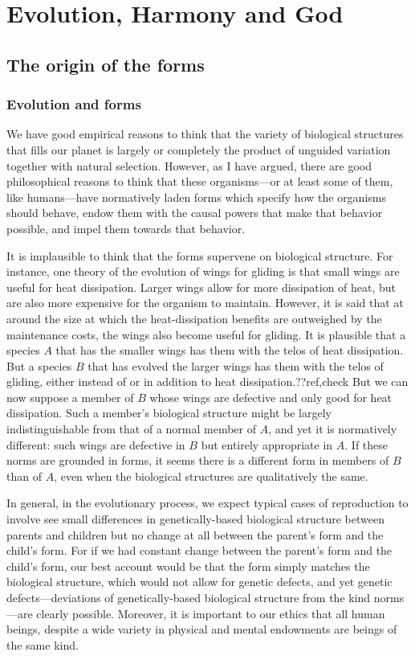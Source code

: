\def\mychapter{XI}

\chapter{Evolution, Harmony and God}\label{ch:God}
\section{The origin of the forms}
\subsection{Evolution and forms}
We have good empirical reasons to think that the variety of biological structures that fills our planet 
is largely or completely the product of unguided variation together with natural selection. However, as
I have argued, there are good philosophical reasons to think that these organisms---or at least some of
them, like humans---have normatively laden forms which specify how the organisms should behave, endow them with the causal
powers that make that behavior possible, and impel them towards that behavior. 

It is implausible to think that the forms supervene on biological structure. For instance, one theory
of the evolution of wings for gliding is that small wings are useful for heat dissipation. Larger wings allow
for more dissipation of heat, but are also more expensive for the organism to maintain. However, it is said that
at around
the size at which the heat-dissipation benefits are outweighed by the maintenance costs, the wings also become
useful for gliding. It is plausible that a species $A$ that has the smaller wings has them with the telos of
heat dissipation. But a species $B$ that has evolved the larger wings has them with the telos of gliding, either
instead of or in addition to heat dissipation.??ref,check But we can now suppose a member of $B$ whose wings are defective
and only good for heat dissipation. Such a member's biological structure might be largely indistinguishable from
that of a normal member of $A$, and yet it is normatively different: such wings are defective in $B$ but entirely
appropriate in $A$. If these norms are grounded in forms, it seems there is a different form in members of $B$ than
of $A$, even when the biological structures are qualitatively the same.

In general, in the evolutionary process, we expect typical cases of reproduction to involve see small differences in genetically-based biological structure 
between parents and children but no change at all between the parent's form and the child's form. For if we had constant change
between the parent's form and the child's form, our best account would be that the form simply matches the
biological structure, which would not allow for genetic defects, and yet genetic defects---deviations of genetically-based
biological structure from the kind norms---are clearly possible.  Moreover, it is important to our ethics
that all human beings, despite a wide variety in physical and mental endowments are beings of the same kind. 

